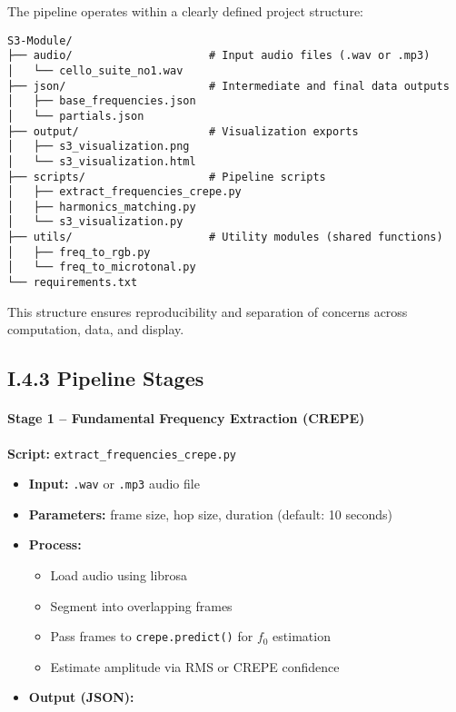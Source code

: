 The pipeline operates within a clearly defined project structure:

\begin{verbatim}
S3-Module/
├── audio/                     # Input audio files (.wav or .mp3)
│   └── cello_suite_no1.wav
├── json/                      # Intermediate and final data outputs
│   ├── base_frequencies.json
│   └── partials.json
├── output/                    # Visualization exports
│   ├── s3_visualization.png
│   └── s3_visualization.html
├── scripts/                   # Pipeline scripts
│   ├── extract_frequencies_crepe.py
│   ├── harmonics_matching.py
│   └── s3_visualization.py
├── utils/                     # Utility modules (shared functions)
│   ├── freq_to_rgb.py
│   └── freq_to_microtonal.py
└── requirements.txt
\end{verbatim}

This structure ensures reproducibility and separation of concerns across computation, data, and display.

\subsection*{I.4.3 Pipeline Stages}

\paragraph{Stage 1 – Fundamental Frequency Extraction (CREPE)}  
\textbf{Script:} \texttt{extract\_frequencies\_crepe.py}

\begin{itemize}
    \item \textbf{Input:} \texttt{.wav} or \texttt{.mp3} audio file  
    \item \textbf{Parameters:} frame size, hop size, duration (default: 10 seconds)
    \item \textbf{Process:}
    \begin{itemize}
        \item Load audio using librosa
        \item Segment into overlapping frames
        \item Pass frames to \texttt{crepe.predict()} for $f_0$ estimation
        \item Estimate amplitude via RMS or CREPE confidence
    \end{itemize}
    \item \textbf{Output (JSON):}
\end{itemize}

